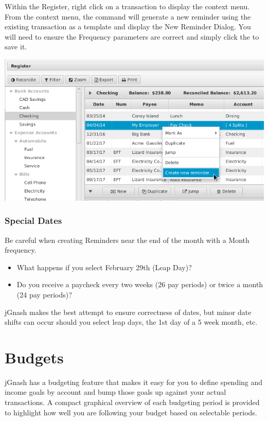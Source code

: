 \documentclass[letterpaper,12pt]{book}
\begin{document}
    Within the Register, right click on a transaction to display the context menu.
    From the context menu, the  command will generate a new reminder using the existing
    transaction as a template and display the New Reminder Dialog.
    You will need to ensure the Frequency parameters are correct and simply click the to save it.

    \includegraphics[width=0.8\linewidth]{images/remindersQuickTransaction}

    \subsection{Special Dates}
    Be careful when creating Reminders near the end of the month with a Month frequency.

    \begin{itemize}
        \item What happens if you select February 29th (Leap Day)?
        \item Do you receive a paycheck every two weeks (26 pay periods) or twice a month (24 pay periods)?
    \end{itemize}

    jGnash makes the best attempt to ensure correctness of dates, but minor date shifts can occur should you select leap days,
    the 1st day of a 5 week month, etc.

    \chapter{Budgets}

    jGnash has a budgeting feature that makes it easy for you to define spending and income goals by account and bump those goals up against your actual transactions.
    A compact graphical overview of each budgeting period is provided to highlight how well you are following your budget based on selectable periods.
\end{document}
